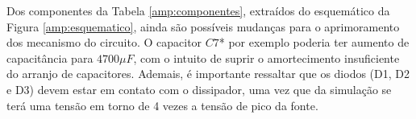 \documentclass[a4paper,12pt,oneside,openany,table,xcdraw]{article}
\begin{document}
\vspace{0.4cm}
Dos componentes da Tabela \ref{amp:componentes}, extraídos do esquemático da Figura \ref{amp:esquematico}, ainda são possíveis mudanças para o aprimoramento dos mecanismo do circuito. O capacitor $C7$* por exemplo poderia ter aumento de capacitância para $4700 \mu F$, com o intuito de suprir o amortecimento insuficiente do arranjo de capacitores. %
Ademais, é importante ressaltar que os diodos (D1, D2 e D3) devem estar em contato com o dissipador, uma vez que da simulação se terá uma tensão em torno de 4 vezes a tensão de pico da fonte. %
\end{document}
